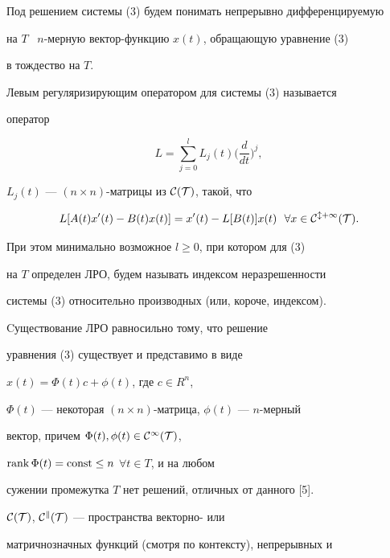 Под решением системы (3) будем понимать непрерывно дифференцируемую


на $T$ \ $n$-мерную вектор-функцию $x(t)$, обращающую уравнение (3)


в тождество на $T$.





\begin{defn}


Левым регуляризирующим оператором для системы (3) называется


оператор 


\begin{equation}


L=\sum^l_{j=0}L_j(t)\bigg(\frac{d}{d t}\bigg)^j,


\end{equation}


$L_j(t)$ --- $(n\times n)$-матрицы из $\cal C(T)$, такой, что


$$


L[A(t)x'(t)-B(t)x(t)]=x'(t)-L[B(t)]x(t)\ \ \forall x\in \cal C^{l+1}(T).


$$





При этом минимально возможное $l\geq 0$, при котором для (3)


на $T$ определен ЛРО, будем называть индексом неразрешенности


системы (3) относительно производных (или, короче, индексом).


\end{defn}





Cуществование ЛРО равносильно тому, что решение


уравнения (3) существует и представимо в виде


$x(t)= \Phi (t)c+\phi(t)$, где $c \in R^n$,


$\Phi (t)$ --- некоторая $(n \times n)$-матрица, $\phi (t)$ --- $n$-мерный


вектор, причем $\Phi(t),\phi(t) \in \cal C^1(T)$,


$\operatorname{rank} \Phi (t)=\operatorname{const} \leq n$ $\forall t \in T$, и на любом


сужении промежутка $T$ нет решений, отличных от данного [5].


$\cal C(T)$, $\cal C^k(T)$ --- пространства векторно- или


матричнозначных функций (смотря по контексту), непрерывных и


